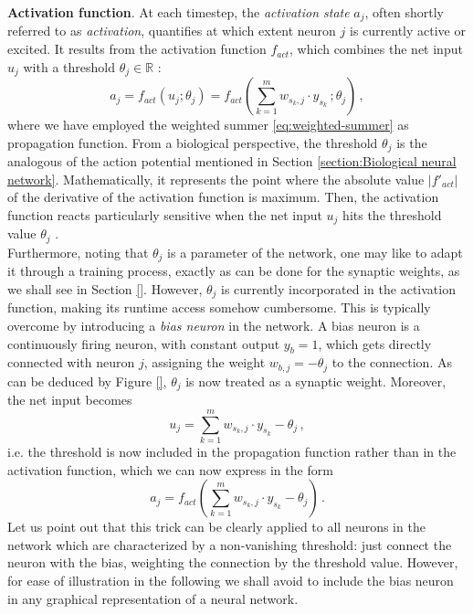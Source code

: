\documentclass[11pt, a4paper]{report}
\theoremstyle{theorem}
\numberwithin{equation}{section}
\numberwithin{figure}{section}
\begin{document}
		\noindent \textbf{Activation function}. At each timestep, the \emph{activation state} $a_j$, often shortly referred to as \emph{activation}, quantifies at which extent neuron $j$ is currently active or excited. It results from the activation function $f_{act}$, which combines the net input $u_j$ with a threshold $\theta_j \in \mathbb{R}$ \cite{Kri}: 
		\begin{equation}
			\label{eq:activation-function}
			a_j = f_{act}(u_j; \theta_j) = f_{act}(\sum_{k = 1}^m w_{s_k,j} \cdot y_{s_k} \, ; \theta_j) \, ,
		\end{equation}
		where we have employed the weighted summer \eqref{eq:weighted-summer} as propagation function. From a biological perspective, the threshold $\theta_j$ is the analogous of the action potential mentioned in Section \ref{section:Biological neural network}. Mathematically, it represents the point where the absolute value $|f'_{act}|$ of the derivative of the activation function is maximum. Then, the activation function reacts particularly sensitive when the net input $u_j$ hits the threshold value $\theta_j$ \cite{Kri}. \\
		Furthermore, noting that $\theta_j$ is a parameter of the network, one may like to adapt it through a training process, exactly as can be done for the synaptic weights, as we shall see in Section \ref{}. However, $\theta_j$ is currently incorporated in the activation function, making its runtime access somehow cumbersome. This is typically overcome by introducing a \emph{bias neuron} in the network. A bias neuron is a continuously firing neuron, with constant output $y_{b} = 1$, which gets directly connected with neuron $j$, assigning the weight $w_{b,j} = - \theta_j$ to the connection. As can be deduced by Figure \ref{}, $\theta_j$ is now treated as a synaptic weight. Moreover, the net input becomes
		\begin{equation}
			u_j = \sum_{k = 1}^m w_{s_k,j} \cdot y_{s_k} - \theta_j \, ,
		\end{equation}
		i.e. the threshold is now included in the propagation function rather than in the activation function, which we can now express in the form
		\begin{equation}
			a_j = f_{act}(\sum_{k = 1}^m w_{s_k,j} \cdot y_{s_k} - \theta_j) \, .
		\end{equation}
		Let us point out that this trick can be clearly applied to all neurons in the network which are characterized by a non-vanishing threshold: just connect the neuron with the bias, weighting the connection by the threshold value. However, for ease of illustration in the following we shall avoid to include the bias neuron in any graphical representation of a neural network.
		
\end{document}
